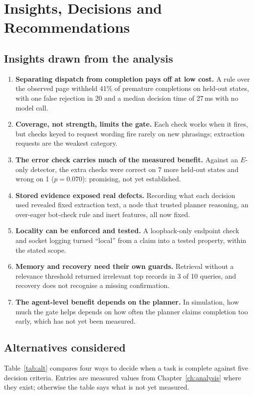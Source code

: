 \chapter{Insights, Decisions and Recommendations}
\label{ch:insights}

\section{Insights drawn from the analysis}

\begin{enumerate}
\item \textbf{Separating dispatch from completion pays off at low cost.} A rule over the observed page withheld 41\% of premature completions on held-out states, with one false rejection in 20 and a median decision time of 27\,ms with no model call.
\item \textbf{Coverage, not strength, limits the gate.} Each check works when it fires, but checks keyed to request wording fire rarely on new phrasings; extraction requests are the weakest category.
\item \textbf{The error check carries much of the measured benefit.} Against an $E$-only detector, the extra checks were correct on 7 more held-out states and wrong on 1 ($p=0.070$): promising, not yet established.
\item \textbf{Stored evidence exposed real defects.} Recording what each decision used revealed fixed extraction text, a node that trusted planner reasoning, an over-eager bot-check rule and inert features, all now fixed.
\item \textbf{Locality can be enforced and tested.} A loopback-only endpoint check and socket logging turned ``local'' from a claim into a tested property, within the stated scope.
\item \textbf{Memory and recovery need their own guards.} Retrieval without a relevance threshold returned irrelevant top records in 3 of 10 queries, and recovery does not recognise a missing confirmation.
\item \textbf{The agent-level benefit depends on the planner.} In simulation, how much the gate helps depends on how often the planner claims completion too early, which has not yet been measured.
\end{enumerate}

\section{Alternatives considered}
Table~\ref{tab:alt} compares four ways to decide when a task is complete against five decision criteria. Entries are measured values from Chapter~\ref{ch:analysis} where they exist; otherwise the table says what is not yet measured.

